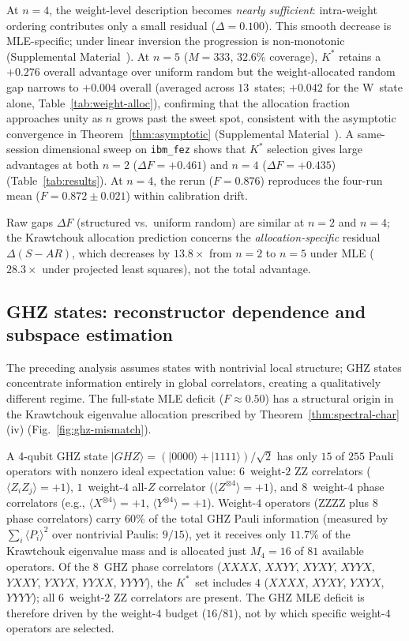 \documentclass[twocolumn,prx,aps,superscriptaddress,longbibliography,floatfix]{revtex4-2}
\begin{document}
At $n = 4$, the weight-level description becomes \emph{nearly
sufficient}: intra-weight ordering contributes only a small
residual ($\Delta = 0.100$).
This smooth decrease is MLE-specific; under linear inversion the
progression is non-monotonic
(Supplemental Material~\cite{supplemental}).
At $n = 5$ ($M = 333$, $32.6$\% coverage), $K^*$ retains
a $+0.276$ overall advantage over uniform random but the
weight-allocated random gap narrows to $+0.004$ overall
(averaged across $13$~states; $+0.042$ for the W~state alone,
Table~\ref{tab:weight-alloc}), confirming
that the allocation fraction approaches unity as $n$ grows past
the sweet spot, consistent with the asymptotic convergence in
Theorem~\ref{thm:asymptotic}
(Supplemental Material~\cite{supplemental}).
A same-session dimensional sweep on \texttt{ibm\_fez} shows that
$K^*$ selection gives large advantages at both $n = 2$ ($\Delta F =
+0.461$) and $n = 4$ ($\Delta F = +0.435$)
(Table~\ref{tab:results}).  At $n = 4$, the rerun ($F = 0.876$)
reproduces the four-run mean ($F = 0.872 \pm 0.021$) within calibration drift.

Raw gaps $\Delta F$ (structured vs.\ uniform random) are
similar at $n = 2$ and $n = 4$; the Krawtchouk allocation prediction
concerns the \emph{allocation-specific} residual $\Delta(S{-}AR)$,
which decreases by $13.8\times$ from $n{=}2$ to $n{=}5$ under MLE
($28.3\times$ under projected least squares), not the total advantage.

\subsection{GHZ states: reconstructor dependence and subspace estimation}
\label{sec:ghz}

The preceding analysis assumes states with nontrivial local
structure; GHZ states concentrate information entirely in global
correlators, creating a qualitatively different regime.
The full-state MLE deficit ($F \approx 0.50$) has a structural
origin in the Krawtchouk eigenvalue allocation prescribed by
Theorem~\ref{thm:spectral-char}(iv)
(Fig.~\ref{fig:ghz-mismatch}).

A 4-qubit GHZ state
$|GHZ\rangle = (|0000\rangle + |1111\rangle)/\sqrt{2}$ has only
$15$ of $255$ Pauli operators with nonzero ideal expectation value:
$6$~weight-$2$ ZZ correlators ($\langle Z_i Z_j\rangle = +1$),
$1$~weight-$4$ all-$Z$ correlator ($\langle Z^{\otimes 4}\rangle = +1$),
and $8$~weight-$4$ phase correlators (e.g.,
$\langle X^{\otimes 4}\rangle = +1$,
$\langle Y^{\otimes 4}\rangle = +1$).
Weight-$4$ operators (ZZZZ plus $8$ phase correlators) carry
$60$\% of the total GHZ Pauli information
(measured by $\sum_i \langle P_i\rangle^2$ over nontrivial Paulis:
$9/15$), yet it receives only $11.7$\% of the Krawtchouk eigenvalue
mass and is allocated just $M_4 = 16$ of $81$ available operators.
Of the $8$~GHZ phase correlators ($XXXX$, $XXYY$, $XYXY$, $XYYX$,
$YXXY$, $YXYX$, $YYXX$, $YYYY$), the $K^*$~set includes $4$
($XXXX$, $XYXY$, $YXYX$, $YYYY$); all $6$~weight-$2$ ZZ correlators
are present.  The GHZ MLE deficit is therefore driven by the weight-$4$
budget ($16/81$), not by which specific weight-$4$ operators are
selected.
\end{document}
